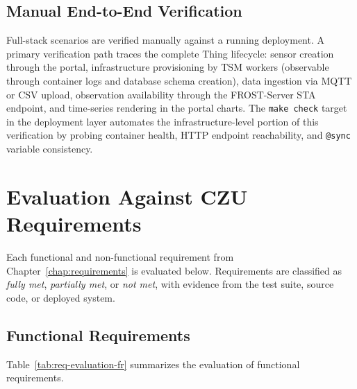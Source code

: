 \subsection{Manual End-to-End Verification}
\label{sec:test-approach-e2e}

Full-stack scenarios are verified manually against a running deployment. A primary
verification path traces the complete Thing lifecycle: sensor creation through the portal,
infrastructure provisioning by TSM workers (observable through container logs and database
schema creation), data ingestion via MQTT or CSV upload, observation availability through
the FROST-Server STA endpoint, and time-series rendering in the portal charts. The
\texttt{make check} target in the deployment layer automates the infrastructure-level
portion of this verification by probing container health, HTTP endpoint reachability, and
\texttt{@sync} variable consistency.

\section{Evaluation Against CZU Requirements}
\label{sec:test-requirements}

Each functional and non-functional requirement from Chapter~\ref{chap:requirements} is
evaluated below. Requirements are classified as \emph{fully met}, \emph{partially met},
or \emph{not met}, with evidence from the test suite, source code, or deployed system.

\subsection{Functional Requirements}
\label{sec:test-requirements-functional}

Table~\ref{tab:req-evaluation-fr} summarizes the evaluation of functional requirements.

